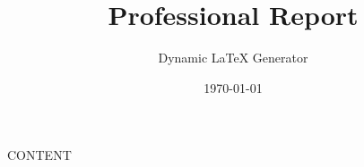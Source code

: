 \documentclass{report}
\title{Professional Report}
\author{Dynamic LaTeX Generator}
\date{\today}
\begin{document}
\maketitle
\tableofcontents
\newpage

{{CONTENT}}
\end{document}
